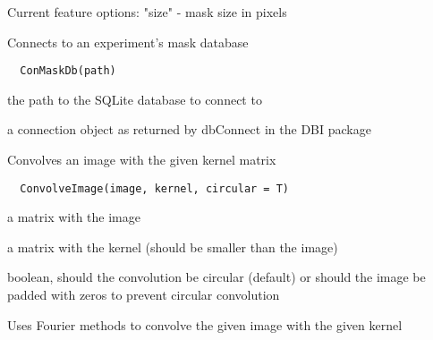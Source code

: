 \documentclass[a4paper]{book}
\begin{document}
%
\begin{Details}\relax
Current feature options: "size" - mask size in pixels
\end{Details}
%
\begin{Description}\relax
Connects to an experiment's mask database
\end{Description}
%
\begin{Usage}
\begin{verbatim}
  ConMaskDb(path)
\end{verbatim}
\end{Usage}
%
\begin{Arguments}
\begin{ldescription}
\item[\code{path}] the path to the SQLite database to connect
to
\end{ldescription}
\end{Arguments}
%
\begin{Value}
a connection object as returned by dbConnect in the DBI
package
\end{Value}
%
\begin{Description}\relax
Convolves an image with the given kernel matrix
\end{Description}
%
\begin{Usage}
\begin{verbatim}
  ConvolveImage(image, kernel, circular = T)
\end{verbatim}
\end{Usage}
%
\begin{Arguments}
\begin{ldescription}
\item[\code{image}] a matrix with the image

\item[\code{kernel}] a matrix with the kernel (should be smaller
than the image)

\item[\code{circular}] boolean, should the convolution be
circular (default) or should the image be padded with
zeros to prevent circular convolution
\end{ldescription}
\end{Arguments}
%
\begin{Details}\relax
Uses Fourier methods to convolve the given image with the
given kernel
\end{Details}
\end{document}
